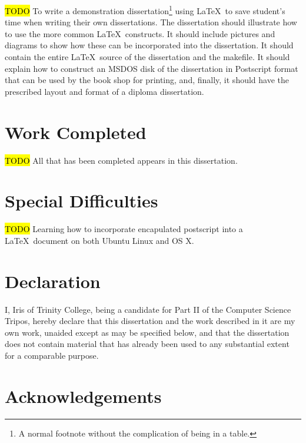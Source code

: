 \documentclass[12pt,a4paper,twoside,openright]{report}
\begin{document}
	\hl{TODO} To write a demonstration dissertation\footnote{A normal footnote without the
		complication of being in a table.} using \LaTeX\ to save
	student's time when writing their own dissertations. The dissertation
	should illustrate how to use the more common \LaTeX\ constructs. It
	should include pictures and diagrams to show how these can be
	incorporated into the dissertation.  It should contain the entire
	\LaTeX\ source of the dissertation and the makefile.  It should
	explain how to construct an MSDOS disk of the dissertation in
	Postscript format that can be used by the book shop for printing, and,
	finally, it should have the prescribed layout and format of a diploma
	dissertation.
	
	
	\section*{Work Completed}
	
	\hl{TODO} All that has been completed appears in this dissertation.
	
	\section*{Special Difficulties}
	
	\hl{TODO} Learning how to incorporate encapulated postscript into a \LaTeX\
	document on both Ubuntu Linux and OS X.
	
	\newpage
	\section*{Declaration}
	
	I, Iris of Trinity College, being a candidate for Part II of the Computer
	Science Tripos, hereby declare
	that this dissertation and the work described in it are my own work,
	unaided except as may be specified below, and that the dissertation
	does not contain material that has already been used to any substantial
	extent for a comparable purpose.
	
	\bigskip
	
	\medskip
	
	\tableofcontents
	
	\listoffigures
	
	\newpage
	\frenchspacing
	\section*{Acknowledgements}
	
\end{document}
